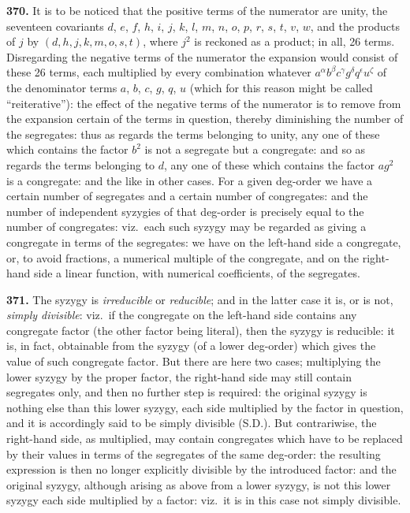 \documentclass[12pt,a4paper]{article}
\begin{document}
\medskip

\noindent\textbf{370.} It is to be noticed that the positive terms of the numerator are unity, the seventeen covariants $d$, $e$, $f$, $h$, $i$, $j$, $k$, $l$, $m$, $n$, $o$, $p$, $r$, $s$, $t$, $v$, $w$, and the products of $j$ by $(d, h, j, k, m, o, s, t)$, where $j^2$ is reckoned as a product; in all, 26 terms. Disregarding the negative terms of the numerator the expansion would consist of these 26 terms, each multiplied by every combination whatever $a^\alpha b^\beta c^\gamma g^\delta q^\epsilon u^\zeta$ of the denominator terms $a$, $b$, $c$, $g$, $q$, $u$ (which for this reason might be called ``reiterative''): the effect of the negative terms of the numerator is to remove from the expansion certain of the terms in question, thereby diminishing the number of the segregates: thus as regards the terms belonging to unity, any one of these which contains the factor $b^2$ is not a segregate but a congregate: and so as regards the terms belonging to $d$, any one of these which contains the factor $ag^2$ is a congregate: and the like in other cases. For a given deg-order we have a certain number of segregates and a certain number of congregates: and the number of independent syzygies of that deg-order is precisely equal to the number of congregates: viz.\ each such syzygy may be regarded as giving a congregate in terms of the segregates: we have on the left-hand side a congregate, or, to avoid fractions, a numerical multiple of the congregate, and on the right-hand side a linear function, with numerical coefficients, of the segregates.

\medskip

\noindent\textbf{371.} The syzygy is \textit{irreducible} or \textit{reducible}; and in the latter case it is, or is not, \textit{simply divisible}: viz.\ if the congregate on the left-hand side contains any congregate factor (the other factor being literal), then the syzygy is reducible: it is, in fact, obtainable from the syzygy (of a lower deg-order) which gives the value of such congregate factor. But there are here two cases; multiplying the lower syzygy by the proper factor, the right-hand side may still contain segregates only, and then no further step is required: the original syzygy is nothing else than this lower syzygy, each side multiplied by the factor in question, and it is accordingly said to be simply divisible (S.D.). But contrariwise, the right-hand side, as multiplied, may contain congregates which have to be replaced by their values in terms of the segregates of the same deg-order: the resulting expression is then no longer explicitly divisible by the introduced factor: and the original syzygy, although arising as above from a lower syzygy, is not this lower syzygy each side multiplied by a factor: viz.\ it is in this case not simply divisible.
\end{document}

